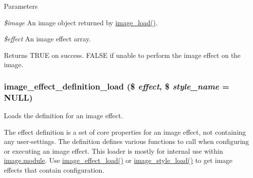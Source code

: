 \begin{DoxyParams}{Parameters}
\item[{\em \$image}]An image object returned by \hyperlink{group__image_ga96098e5b039dc3906a656fa889a04776}{image\_\-load()}. \item[{\em \$effect}]An image effect array.\end{DoxyParams}
\begin{DoxyReturn}{Returns}
TRUE on success. FALSE if unable to perform the image effect on the image. 
\end{DoxyReturn}
\hypertarget{image_8module_a91383fe83b2a2da4c90b4221e48abf6a}{
\subsubsection[{image\_\-effect\_\-definition\_\-load}]{\setlength{\rightskip}{0pt plus 5cm}image\_\-effect\_\-definition\_\-load (\$ {\em effect}, \/  \$ {\em style\_\-name} = {\ttfamily NULL})}}
\label{image_8module_a91383fe83b2a2da4c90b4221e48abf6a}
Loads the definition for an image effect.

The effect definition is a set of core properties for an image effect, not containing any user-\/settings. The definition defines various functions to call when configuring or executing an image effect. This loader is mostly for internal use within \hyperlink{image_8module}{image.module}. Use \hyperlink{image_8module_a7ad62224057dbc7757dfa2df898926ad}{image\_\-effect\_\-load()} or \hyperlink{image_8module_a0d7388bec5f42788968823a8099a64a7}{image\_\-style\_\-load()} to get image effects that contain configuration.


